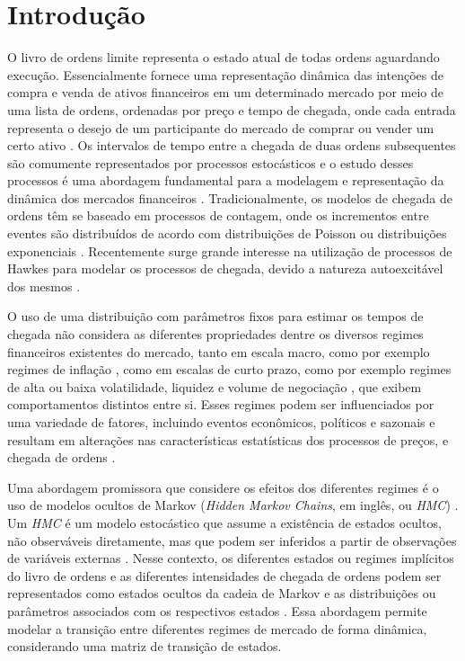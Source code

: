 \chapter{Introdução}

O livro de ordens limite representa o estado atual de todas ordens aguardando execução. Essencialmente fornece uma representação dinâmica das intenções de compra e venda de ativos financeiros em um determinado mercado por meio de uma lista de ordens, ordenadas por preço e tempo de chegada, onde cada entrada representa o desejo de um participante do mercado de comprar ou vender um certo ativo \citep{Abergel2020, Avellaneda2008}. Os intervalos de tempo entre a chegada de duas ordens subsequentes são comumente representados por processos estocásticos e o estudo desses processos é uma abordagem fundamental para a modelagem e representação da dinâmica dos mercados financeiros \citep{Shi2022, Guilbaud2013, Liu2021}. Tradicionalmente, os modelos de chegada de ordens têm se baseado em processos de contagem, onde os incrementos entre eventes são distribuídos de acordo com distribuições de Poisson ou distribuições exponenciais \citep{Cont2022, Ponta2012}. Recentemente surge grande interesse na utilização de processos de Hawkes para modelar os processos de chegada, devido a natureza autoexcitável dos mesmos \citep{Abergel2020, MorariuPatrichi2022, Toke2011}. 

O uso de uma distribuição com parâmetros fixos para estimar os tempos de chegada não considera as diferentes propriedades dentre os diversos regimes financeiros existentes do mercado, tanto em escala macro, como por exemplo regimes de inflação \citep{Krause2022}, como em escalas de curto prazo, como por exemplo regimes de alta ou baixa volatilidade, liquidez e volume de negociação \citep{Guilbaud2013}, que exibem comportamentos distintos entre si. Esses regimes podem ser influenciados por uma variedade de fatores, incluindo eventos econômicos, políticos e sazonais e resultam em alterações nas características estatísticas dos processos de preços, e chegada de ordens \citep{Krause2022}.

Uma abordagem promissora que considere os efeitos dos diferentes regimes é o uso de modelos ocultos de Markov (\textit{Hidden Markov Chains}, em inglês, ou \textit{HMC}) \citep{Cont2010}. Um \textit{HMC} é um modelo estocástico que assume a existência de estados ocultos, não observáveis diretamente, mas que podem ser inferidos a partir de observações de variáveis externas \citep{Baum1966}. Nesse contexto, os diferentes estados ou regimes implícitos do livro de ordens e as diferentes intensidades de chegada de ordens podem ser representados como estados ocultos da cadeia de Markov e as distribuições ou parâmetros associados com os respectivos estados \citep{MorariuPatrichi2022}. Essa abordagem permite modelar a transição entre diferentes regimes de mercado de forma dinâmica, considerando uma matriz de transição de estados.

